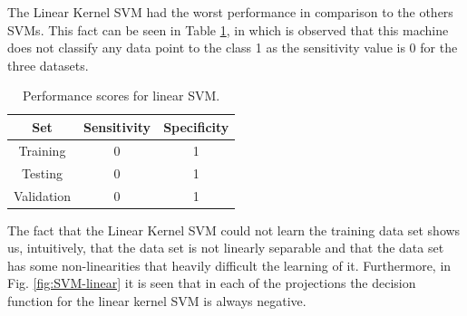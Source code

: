 The Linear Kernel SVM had the worst performance in comparison to the others
SVMs. This fact can be seen in Table \ref{tab:linear_SVM}, in which is observed
that this machine does not classify any data point to the class 1 as the
sensitivity value is 0 for the three datasets.

\begin{table}
  \centering
  \caption{Performance scores for linear SVM.}
  \label{tab:linear_SVM}
  \begin{tabular}{ccc}
    \hline
    \textbf{Set} & \textbf{Sensitivity} & \textbf{Specificity} \\ \hline
    Training & 0 & 1 \\
    Testing & 0 & 1 \\
    Validation & 0 & 1 \\ \hline
  \end{tabular}
\end{table}

The fact that the Linear Kernel SVM could not learn the training data set shows
us, intuitively, that the data set is not linearly separable and that the data
set has some non-linearities that heavily difficult the learning of it.
Furthermore, in Fig. \ref{fig:SVM-linear} it is seen that in each of the
projections the decision function for the linear kernel SVM is always negative.

